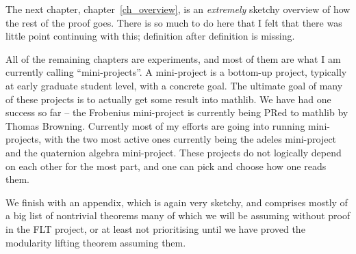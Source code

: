 The next chapter, chapter~\ref{ch_overview}, is an \emph{extremely} sketchy overview of how
the rest of the proof goes. There is so much to do here that I felt that there was little
point continuing with this; definition after definition is missing.

All of the remaining chapters are experiments, and most of them are what I am currently
calling ``mini-projects''. A mini-project is a bottom-up project, typically at early graduate
student level, with a concrete goal. The ultimate goal of many of these projects is to actually
get some result into mathlib. We have had one success so far -- the Frobenius mini-project
is currently being PRed to mathlib by Thomas Browning. Currently most of my efforts are
going into running mini-projects, with the two most active ones currently being the adeles
mini-project and the quaternion algebra mini-project. These projects do not logically depend
on each other for the most part, and one can pick and choose how one reads them.

We finish with an appendix, which is again very sketchy, and comprises mostly of a big
list of nontrivial theorems many of which we will be assuming without proof in the FLT
project, or at least not prioritising until we have proved the modularity lifting
theorem assuming them.
